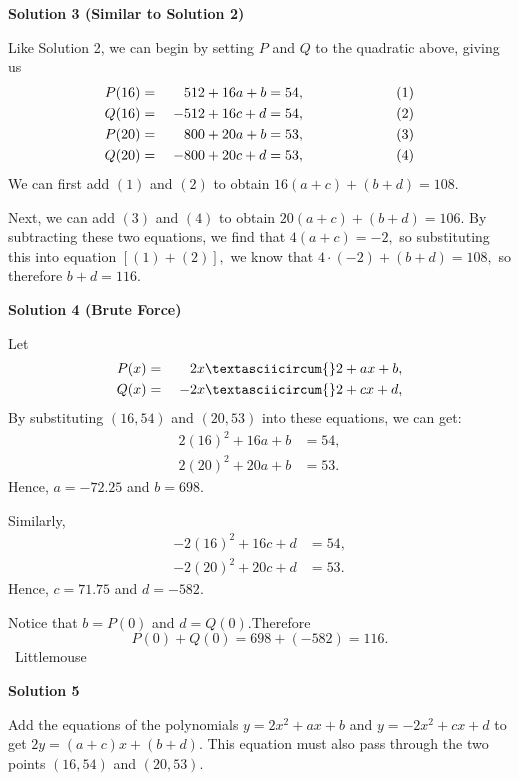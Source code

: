 \begin{enumerate}
 



\textbf{Solution 3 (Similar to Solution 2)}

Like Solution 2, we can begin by setting $P$ and $Q$ to the quadratic above, giving us
 \begin{alignat*}{8} P(16) &= &512 + 16a + b &= 54, \hspace{20mm}&&(1) \\ Q(16) &= &\hspace{1mm}-512 + 16c + d &= 54, &&(2) \\ P(20) &= &800 + 20a + b &= 53,  &&(3) \\ Q(20) &= &\hspace{1mm}-800 + 20c + d &= 53, &&(4) \end{alignat*}We can first add $(1)$ and $(2)$ to obtain $16(a+c) + (b+d) = 108.$ 

 Next, we can add $(3)$ and $(4)$ to obtain $20(a+c) + (b+d) = 106.$ By subtracting these two equations, we find that $4(a+c) = -2,$ so substituting this into equation $[(1) + (2)],$ we know that $4 \cdot (-2) + (b+d) = 108,$ so therefore $b+d = \boxed{116}.$




\textbf{Solution 4 (Brute Force)}

Let
 \begin{alignat*}{8} P(x) &= &2x\textasciicircum{}2 + ax + b, \\ Q(x) &= &\hspace{1mm}-2x\textasciicircum{}2 + cx + d, \end{alignat*}By substituting $(16, 54)$ and $(20, 53)$ into these equations, we can get:
 \begin{align*} 2(16)^2 + 16a + b &= 54, \\ 2(20)^2 + 20a + b &= 53. \end{align*}
Hence, $a = -72.25$ and $b = 698.$

 Similarly,
 \begin{align*} -2(16)^2 + 16c + d &= 54, \\ -2(20)^2 + 20c + d &= 53. \end{align*}
Hence, $c = 71.75$ and $d = -582.$

 Notice that $b = P(0)$ and $d = Q(0).$Therefore 
 \[P(0) + Q(0) = 698 + (-582) = \boxed{116}.\]~Littlemouse

 



\textbf{Solution 5}

Add the equations of the polynomials $y=2x^2+ax+b$ and $y=-2x^2+cx+d$ to get $2y=(a+c)x+(b+d)$. This equation must also pass through the two points $(16,54)$ and $(20,53)$.


\end{enumerate}
